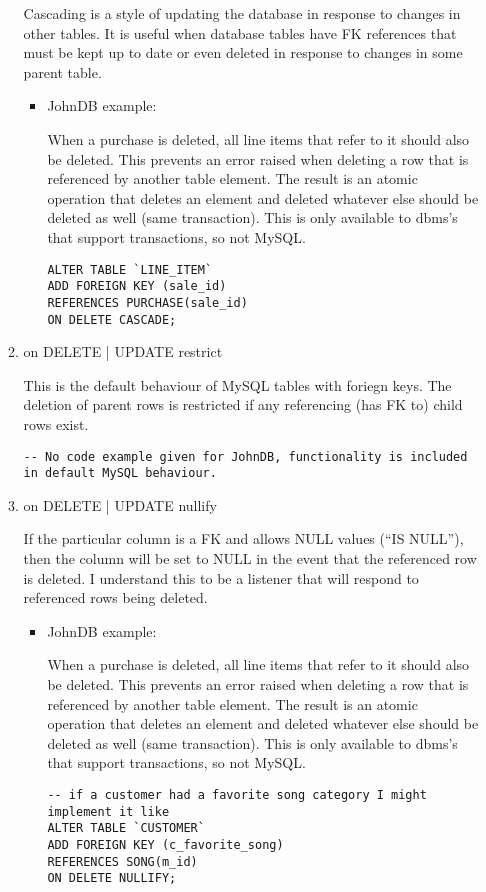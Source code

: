 \documentclass[]{article}
\begin{document}
\begin{enumerate}
\begin{enumerate}
    Cascading is a style of updating the database in response to changes in other tables. It is useful when database tables have FK references that must be kept up to date or even deleted in response to changes in some parent table.

    \begin{itemize}
    \item JohnDB example:

    When a purchase is deleted, all line items that refer to it should also be deleted. This prevents an error raised when deleting a row that is referenced by another table element. The result is an atomic operation that deletes an element and deleted whatever else should be deleted as well (same transaction). This is only available to dbms's that support transactions, so not MySQL.
    \begin{verbatim}
ALTER TABLE `LINE_ITEM`
ADD FOREIGN KEY (sale_id)
REFERENCES PURCHASE(sale_id)
ON DELETE CASCADE;   
    \end{verbatim}
    \end{itemize}


	\item on DELETE | UPDATE restrict

    This is the default behaviour of MySQL tables with foriegn keys. The deletion of parent rows is restricted if any referencing (has FK to) child rows exist.

\begin{verbatim}
-- No code example given for JohnDB, functionality is included in default MySQL behaviour.
\end{verbatim}


	\item on DELETE | UPDATE nullify

    If the particular column is a FK and allows NULL values (``IS NULL''), then the column will be set to NULL in the event that the referenced row is deleted. I understand this to be a listener that will respond to referenced rows being deleted.
    \begin{itemize}
    \item JohnDB example:

    When a purchase is deleted, all line items that refer to it should also be deleted. This prevents an error raised when deleting a row that is referenced by another table element. The result is an atomic operation that deletes an element and deleted whatever else should be deleted as well (same transaction). This is only available to dbms's that support transactions, so not MySQL.
    \begin{verbatim}
-- if a customer had a favorite song category I might implement it like
ALTER TABLE `CUSTOMER`
ADD FOREIGN KEY (c_favorite_song)
REFERENCES SONG(m_id)
ON DELETE NULLIFY;  
    \end{verbatim}
    \end{itemize}
    
    \end{enumerate}


\end{enumerate}
\end{document}
